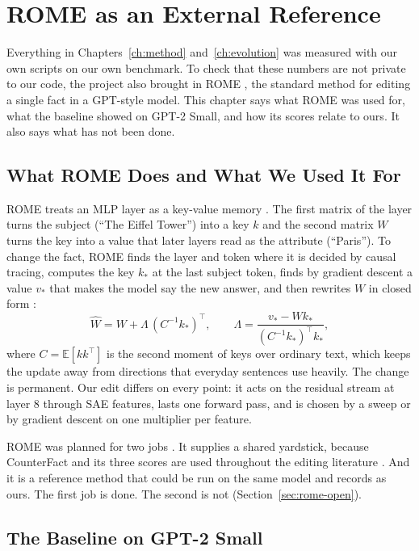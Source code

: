 \chapter{ROME as an External Reference}\label{ch:rome}

Everything in Chapters~\ref{ch:method} and~\ref{ch:evolution} was measured with our own scripts on our own benchmark. To check that these numbers are not private to our code, the project also brought in ROME \cite{r2}, the standard method for editing a single fact in a GPT-style model. This chapter says what ROME was used for, what the baseline showed on GPT-2 Small, and how its scores relate to ours. It also says what has not been done.

\section{What ROME Does and What We Used It For}\label{sec:rome-why}

ROME treats an MLP layer as a key-value memory \cite{r60}. The first matrix of the layer turns the subject (``The Eiffel Tower'') into a key $k$ and the second matrix $W$ turns the key into a value that later layers read as the attribute (``Paris''). To change the fact, ROME finds the layer and token where it is decided by causal tracing, computes the key $k_*$ at the last subject token, finds by gradient descent a value $v_*$ that makes the model say the new answer, and then rewrites $W$ in closed form \cite{r2}:
\begin{equation}\label{eq:rome}
\hat W=W+\Lambda\,(C^{-1}k_*)^{\top},\qquad \Lambda=\frac{v_*-Wk_*}{(C^{-1}k_*)^{\top}k_*},
\end{equation}
where $C=\mathbb{E}[kk^{\top}]$ is the second moment of keys over ordinary text, which keeps the update away from directions that everyday sentences use heavily. The change is permanent. Our edit differs on every point: it acts on the residual stream at layer 8 through SAE features, lasts one forward pass, and is chosen by a sweep or by gradient descent on one multiplier per feature.

ROME was planned for two jobs \cite{p19}. It supplies a shared yardstick, because CounterFact and its three scores are used throughout the editing literature \cite{r2,r3,r32}. And it is a reference method that could be run on the same model and records as ours. The first job is done. The second is not (Section~\ref{sec:rome-open}).

\section{The Baseline on GPT-2 Small}\label{sec:rome-setup}

